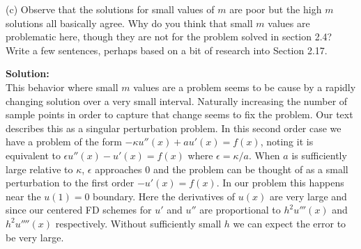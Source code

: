 \documentclass[12pt]{article}
\makeatletter
\theoremstyle{homework}
\newenvironment{exercise}[1]
{\def\@currentlabel{#1}\exercisecore}
{\endexercisecore}
\newcommand{\localhead}[1]{\par\smallskip\noindent\textbf{#1}\nobreak\\}%
\newcommand\solution{\localhead{Solution:}}
\makeatother
\begin{document}
\begin{exercise}{Problem P20}
  \item[(c)] Observe that the solutions for small values of $m$ are poor but the high $m$ solutions all basically agree. Why do you think that 
  small $m$ values are problematic here, though they are not for the problem solved in section 2.4? Write a few sentences, perhaps based on a 
  bit of research into Section 2.17. 
  \solution This behavior where small $m$ values are a problem seems to be cause by a rapidly changing solution over a very small interval. Naturally 
  increasing the number of sample points in order to capture that change seems to fix the problem. Our text describes this as a singular perturbation problem. In this second order case we have 
  a problem of the form $-\kappa u''(x) + au'(x) = f(x)$, noting it is equivalent to $\epsilon u''(x) - u'(x) = f(x)$ where $\epsilon = \kappa/a$. When $a$ is sufficiently large relative to $\kappa$,
  $\epsilon$ approaches 0 and the problem can be thought of as a small perturbation to the first order $-u'(x) = f(x)$. In our problem this happens near the $u(1) = 0$ boundary. Here the derivatives of $u(x)$
  are very large and since our centered FD schemes for $u'$ and $u''$ are proportional to $h^2u'''(x)$ and $h^2u''''(x)$ respectively. Without sufficiently small $h$ we can expect the error to be very large. 


\end{exercise}
\vspace{1in}
\end{document}
